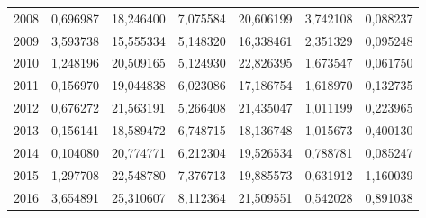 \begin{table}
\begin{tabular}{p{1cm}p{2cm}p{2cm}p{2cm}p{2cm}p{2cm}p{2cm}}
 2008 &                                    0,696987 &             18,246400 &                               7,075584 &                  20,606199 &                       3,742108 &                                  0,088237 \\
 2009 &                                    3,593738 &             15,555334 &                               5,148320 &                  16,338461 &                       2,351329 &                                  0,095248 \\
 2010 &                                    1,248196 &             20,509165 &                               5,124930 &                  22,826395 &                       1,673547 &                                  0,061750 \\
 2011 &                                    0,156970 &             19,044838 &                               6,023086 &                  17,186754 &                       1,618970 &                                  0,132735 \\
 2012 &                                    0,676272 &             21,563191 &                               5,266408 &                  21,435047 &                       1,011199 &                                  0,223965 \\
 2013 &                                    0,156141 &             18,589472 &                               6,748715 &                  18,136748 &                       1,015673 &                                  0,400130 \\
 2014 &                                    0,104080 &             20,774771 &                               6,212304 &                  19,526534 &                       0,788781 &                                  0,085247 \\
 2015 &                                    1,297708 &             22,548780 &                               7,376713 &                  19,885573 &                       0,631912 &                                  1,160039 \\
 2016 &                                    3,654891 &             25,310607 &                               8,112364 &                  21,509551 &                       0,542028 &                                  0,891038 \\
\bottomrule
\end{tabular}
\end{table}
